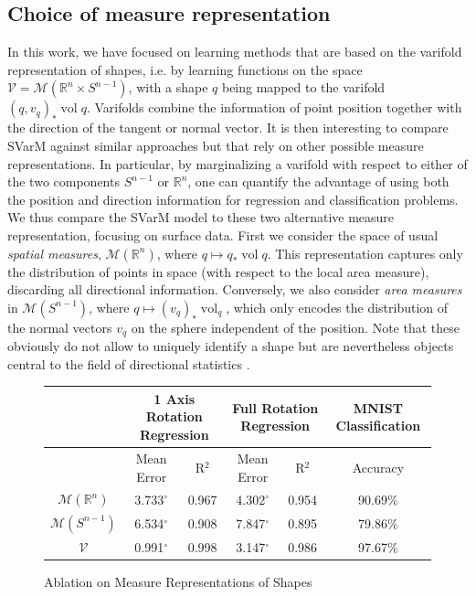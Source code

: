 \documentclass[11pt]{article}
\newcommand{\R}{\mathbb{R}}
\begin{document}
\subsection{Choice of measure representation}\label{sec:Abl_without_normals}
In this work, we have focused on learning methods that are based on the varifold representation of shapes, i.e. by learning functions on the space $\mathcal{V} = \mathcal{M}(\mathbb{R}^n \times S^{n-1})$, with a shape $q$ being mapped to the varifold $(q, v_q)_* \operatorname{vol}q$. Varifolds combine the information of point position together with the direction of the tangent or normal vector. It is then interesting to compare SVarM against similar approaches but that rely on other possible measure representations. In particular, by marginalizing a varifold with respect to either of the two components $S^{n-1}$ or $\R^n$, one can quantify the advantage of using both the position and direction information for regression and classification problems. We thus compare the SVarM model to these two alternative measure representation, focusing on surface data. First we consider the space of usual \textit{spatial measures}, $\mathcal{M}(\mathbb{R}^n)$, where $q \mapsto q_{*} \operatorname{vol}q$. This representation captures only the distribution of points in space (with respect to the local area measure), discarding all directional information. Conversely, we also consider \textit{area measures} in $\mathcal{M}(S^{n-1})$, where $q \mapsto (v_q)_{*} \operatorname{vol}_q$, which only encodes the distribution of the normal vectors $v_q$ on the sphere independent of the position. Note that these obviously do not allow to uniquely identify a shape but are nevertheless objects central to the field of directional statistics \cite{mardia2009directional}.
\begin{figure}[h!]
    \centering
    \begin{tabular}{|| c | c c | c c | c ||} 
      \hline
      &\multicolumn{2}{c|}{1 Axis Rotation Regression}&\multicolumn{2}{c|}{Full Rotation Regression}&MNIST Classification\\
      \hline
      & Mean Error & R$^2$ & Mean Error & R$^2$ & Accuracy \\
      \hline
      $\mathcal{M}(\R^n)$&3.733$^\circ$& 0.967 & 4.302$^\circ$ & 0.954 & 90.69\% \\
      $\mathcal{M}(S^{n-1})$&6.534$^\circ$& 0.908 & 7.847$^\circ$ & 0.895 & 79.86\%\\
      $\mathcal{V}$& 0.991$^\circ$ & 0.998 & 3.147$^\circ$ & 0.986 & 97.67\% \\
      \hline
    \end{tabular}
  \caption{Ablation on Measure Representations of Shapes}\label{tab:ablation_measures}
\end{figure}
\end{document}
